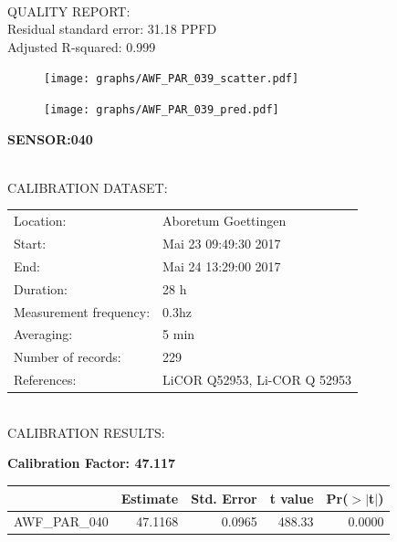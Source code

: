 \documentclass[oneside]{report}
\begin{document}
\hrulefill\\
QUALITY REPORT:\\
Residual standard error: 31.18 PPFD\\
Adjusted R-squared: 0.999



\begin{figure}[H]
  \centering
  \texttt{[image: graphs/AWF\_PAR\_039\_scatter.pdf]}
\end{figure}




\begin{figure}[H]
  \centering
  \texttt{[image: graphs/AWF\_PAR\_039\_pred.pdf]}
\end{figure}

\pagebreak


\begin{center}
\large{\textbf{SENSOR:040}}\\
\end{center}

\hrulefill\\
CALIBRATION DATASET:\\
\begin{table}[h!]
  \centering
  \label{tab:table1}
  \begin{tabular}{ll}
    Location: & Aboretum Goettingen\\ 
    
    
    Start:  & Mai 23 09:49:30 2017 \\
    End:   & Mai 24 13:29:00 2017\\ 
    Duration: & 28 h\\
    Measurement frequency: & 0.3hz\\
    Averaging:  &5 min\\
    Number of records: & 229 \\
    References: & LiCOR Q52953, Li-COR Q 52953 \\
  \end{tabular}
\end{table}

\hrulefill\\
CALIBRATION RESULTS:\\


\begin{center}
\textbf{\large{Calibration Factor: 47.117}}\\
\end{center}
\begin{table}[ht]
\centering
\begin{tabular}{rrrrr}
  \hline
 & Estimate & Std. Error & t value & Pr($>$$|$t$|$) \\ 
  \hline
AWF\_PAR\_040 & 47.1168 & 0.0965 & 488.33 & 0.0000 \\ 
   \hline
\end{tabular}
\end{table}
\end{document}
